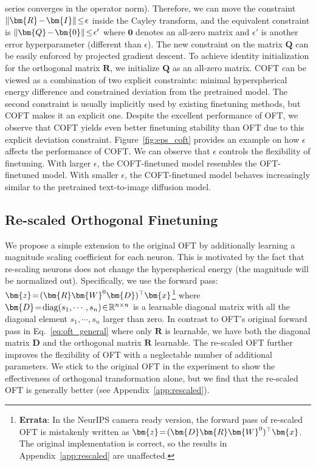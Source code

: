 \vspace{-1.625mm}

series converges in the operator norm). Therefore, we can move the constraint $\thickmuskip=2mu \medmuskip=2mu\|\bm{R}-\bm{I}\|\leq\epsilon$ inside the Cayley transform, and the equivalent constraint is $\thickmuskip=2mu \medmuskip=2mu \|\bm{Q}-\bm{0}\|\leq\epsilon'$ where $\bm{0}$ denotes an all-zero matrix and $\epsilon'$ is another error hyperparameter (different than $\epsilon$). The new constraint on the matrix $\bm{Q}$ can be easily enforced by projected gradient descent. To achieve identity initialization for the orthogonal matrix $\bm{R}$, we initialize $\bm{Q}$ as an all-zero matrix. COFT can be viewed as a combination of two explicit constraints: minimal hyperspherical energy difference and constrained deviation from the pretrained model. The second constraint is usually implicitly used by existing finetuning methods, but COFT makes it an explicit one. Despite the excellent performance of OFT, we observe that COFT yields even better finetuning stability than OFT due to this explicit deviation constraint. Figure~\ref{fig:eps_coft} provides an example on how $\epsilon$ affects the performance of COFT. We can observe that $\epsilon$ controls the flexibility of finetuning. With larger $\epsilon$, the COFT-finetuned model resembles the OFT-finetuned model. With smaller $\epsilon$, the COFT-finetuned model behaves increasingly similar to the pretrained text-to-image diffusion model.

\vspace{-1.5mm}
\subsection{Re-scaled Orthogonal Finetuning}
\vspace{-0.9mm}
We propose a simple extension to the original OFT by additionally learning a magnitude scaling coefficient for each neuron. This is motivated by the fact that re-scaling neurons does not change the hyperspherical energy (the magnitude will be normalized out). Specifically, we use the forward pass: $\thickmuskip=2mu \medmuskip=2mu\bm{z}=(\bm{R}\bm{W}^0\bm{D})^\top\bm{x}$\footnote{\textbf{Errata}: In the NeurIPS camera ready version, the forward pass of re-scaled OFT is mistakenly written as $\thickmuskip=2mu \medmuskip=2mu\bm{z}=(\bm{D}\bm{R}\bm{W}^0)^\top\bm{x}$. The original implementation is correct, so the results in Appendix~\ref{app:rescaled} are unaffected.} where $\thickmuskip=2mu \medmuskip=2mu \bm{D}=\text{diag}(s_1,\cdots,s_n)\in\mathbb{R}^{n\times n}$ is a learnable diagonal matrix with all the diagonal element $s_1,\cdots,s_n$ larger than zero. In contrast to OFT's original forward pass in Eq.~\eqref{eq:oft_general} where only $\bm{R}$ is learnable, we have both the diagonal matrix $\bm{D}$ and the orthogonal matrix $\bm{R}$ learnable. The re-scaled OFT further improves the flexibility of OFT with a neglectable number of additional parameters. We stick to the original OFT in the experiment to show the effectiveness of orthogonal transformation alone, but we find that the re-scaled OFT is generally better (see Appendix~\ref{app:rescaled}).


